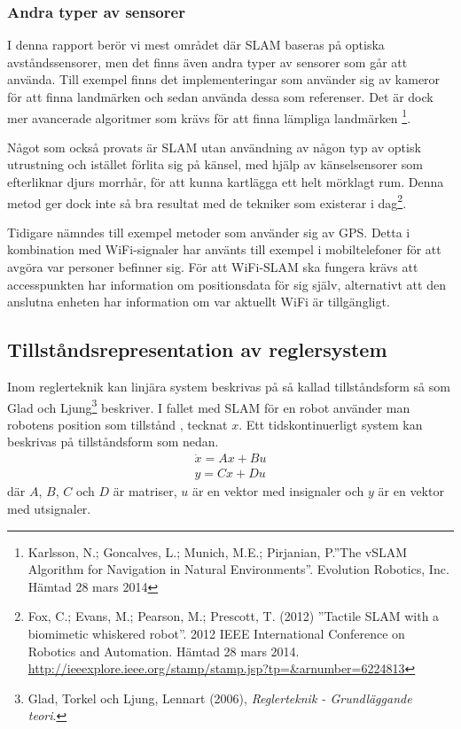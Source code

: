\documentclass[a4paper,12pt,fleqn]{article}
\begin{document}
\subsubsection{Andra typer av sensorer}

I denna rapport berör vi mest området där SLAM baseras på optiska avståndssensorer, men det finns även andra typer av sensorer som går att använda. Till exempel finns det implementeringar som använder sig av kameror för att finna landmärken och sedan använda dessa som referenser. Det är dock mer avancerade algoritmer som krävs för att finna lämpliga landmärken \footnote{Karlsson, N.; Goncalves, L.; Munich, M.E.; Pirjanian, P.''The vSLAM Algorithm for Navigation in Natural Environments''. Evolution Robotics, Inc. Hämtad 28 mars 2014}.

Något som också provats är SLAM utan användning av någon typ av optisk utrustning och istället förlita sig på känsel, med hjälp av känselsensorer som efterliknar djurs morrhår, för att kunna kartlägga ett helt mörklagt rum. Denna metod ger dock inte så bra resultat med de tekniker som existerar i dag\footnote{Fox, C.; Evans, M.; Pearson, M.; Prescott, T. (2012)
''Tactile SLAM with a biomimetic whiskered robot''. 2012 IEEE International Conference on Robotics and Automation. Hämtad 28 mars 2014.
\url{http://ieeexplore.ieee.org/stamp/stamp.jsp?tp=&arnumber=6224813}
}.

Tidigare nämndes till exempel metoder som använder sig av GPS. Detta i kombination med WiFi-signaler har använts till exempel i mobiltelefoner för att avgöra var personer befinner sig. För att WiFi-SLAM ska fungera krävs att accesspunkten har information om positionsdata för sig själv, alternativt att den anslutna enheten har information om var aktuellt WiFi är tillgängligt.



\subsection{Tillståndsrepresentation av reglersystem}

Inom reglerteknik kan linjära system beskrivas på så kallad tillståndsform så som Glad och Ljung\footnote{Glad, Torkel och Ljung, Lennart (2006), \textit{Reglerteknik - Grundläggande teori}.} beskriver. I fallet med SLAM för en robot använder man robotens position som tillstånd , tecknat $x$. Ett tidskontinuerligt system kan beskrivas på tillståndsform som nedan.
\begin{gather}
\dot{x}=Ax+Bu \\
y=Cx+Du	
\label{equ:tillstand}
\end{gather}
där $A$, $B$, $C$ och $D$ är matriser, $u$ är en vektor med insignaler och $y$ är en vektor med utsignaler.
\end{document}
